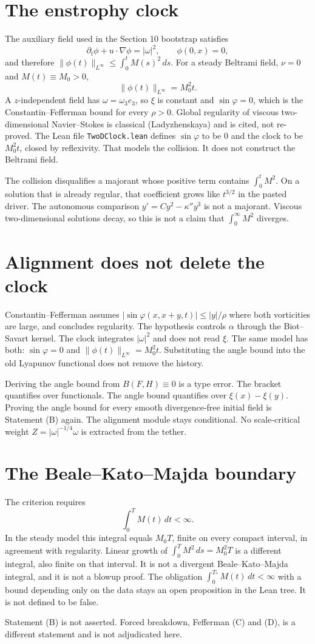 \documentclass[11pt,a4paper]{article}
\begin{document}
\section{The enstrophy clock}
The auxiliary field used in the Section 10 bootstrap satisfies
\[
\partial_t\phi+u\cdot\nabla\phi=|\omega|^2,\qquad\phi(0,x)=0,
\]
and therefore $\|\phi(t)\|_{L^\infty}\le\int_0^t M(s)^2\,ds$. For a steady Beltrami field, $\nu=0$ and $M(t)\equiv M_0>0$,
\[
\|\phi(t)\|_{L^\infty}=M_0^2 t.
\]
A $z$-independent field has $\omega=\omega_3 e_3$, so $\xi$ is constant and $\sin\varphi=0$, which is the Constantin--Fefferman bound for every $\rho>0$. Global regularity of viscous two-dimensional Navier--Stokes is classical (Ladyzhenskaya) and is cited, not re-proved. The Lean file \texttt{TwoDClock.lean} defines $\sin\varphi$ to be $0$ and the clock to be $M_0^2 t$, closed by reflexivity. That models the collision. It does not construct the Beltrami field.

The collision disqualifies a majorant whose positive term contains $\int_0^t M^2$. On a solution that is already regular, that coefficient grows like $t^{3/2}$ in the pasted driver. The autonomous comparison $y'=C y^2-\kappa'' y^3$ is not a majorant. Viscous two-dimensional solutions decay, so this is not a claim that $\int_0^\infty M^2$ diverges.

\section{Alignment does not delete the clock}
Constantin--Fefferman assumes $|\sin\varphi(x,x+y,t)|\le|y|/\rho$ where both vorticities are large, and concludes regularity. The hypothesis controls $\alpha$ through the Biot--Savart kernel. The clock integrates $|\omega|^2$ and does not read $\xi$. The same model has both: $\sin\varphi=0$ and $\|\phi(t)\|_{L^\infty}=M_0^2 t$. Substituting the angle bound into the old Lyapunov functional does not remove the history.

Deriving the angle bound from $B(F,H)\equiv 0$ is a type error. The bracket quantifies over functionals. The angle bound quantifies over $\xi(x)-\xi(y)$. Proving the angle bound for every smooth divergence-free initial field is Statement (B) again. The alignment module stays conditional. No scale-critical weight $Z=|\omega|^{-1/4}\omega$ is extracted from the tether.

\section{The Beale--Kato--Majda boundary}
The criterion requires
\[
\int_0^T M(t)\,dt<\infty.
\]
In the steady model this integral equals $M_0 T$, finite on every compact interval, in agreement with regularity. Linear growth of $\int_0^T M^2\,ds=M_0^2 T$ is a different integral, also finite on that interval. It is not a divergent Beale--Kato--Majda integral, and it is not a blowup proof. The obligation $\int_0^{T_*} M(t)\,dt<\infty$ with a bound depending only on the data stays an open proposition in the Lean tree. It is not defined to be false.

Statement (B) is not asserted. Forced breakdown, Fefferman (C) and (D), is a different statement and is not adjudicated here.
\end{document}
